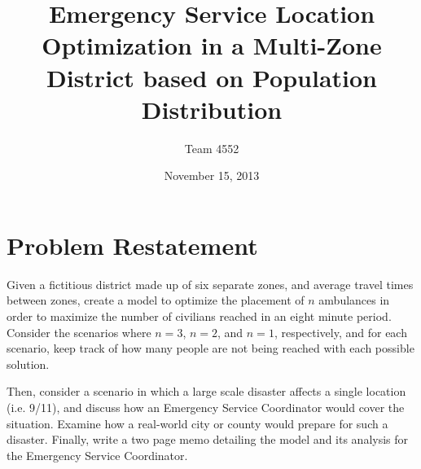 \documentclass[notitlepage, 12pt]{article}
\title{\textbf{Emergency Service Location Optimization in a Multi-Zone District based on Population Distribution}}
\author{Team 4552}
\date{November 15, 2013}
\begin{document}
\maketitle

\tableofcontents
\newpage
\section{Problem Restatement}
Given a fictitious district made up of six separate zones, and average travel times between zones, create a model to optimize the placement of $n$ ambulances in order to maximize the number of civilians reached in an eight minute period. Consider the scenarios where $n = 3$, $n = 2$, and $n = 1$, respectively, and for each scenario, keep track of how many people are not being reached with each possible solution.

Then, consider a scenario in which a large scale disaster affects a single location (i.e. 9/11), and discuss how an Emergency Service Coordinator would cover the situation. Examine how a real-world city or county would prepare for such a disaster. Finally, write a two page memo detailing the model and its analysis for the Emergency Service Coordinator.
\end{document}
